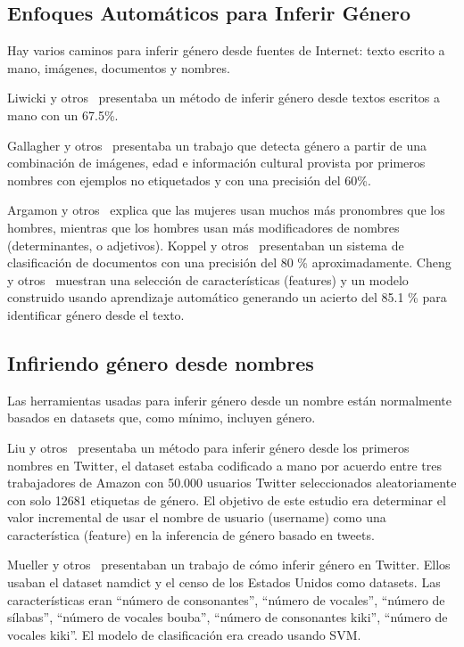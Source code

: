 \documentclass[a4paper]{article}
\begin{document}
\subsection{Enfoques Automáticos para Inferir Género}

Hay varios caminos para inferir género desde fuentes de Internet:
texto escrito a mano, imágenes, documentos y nombres.

Liwicki y otros~\cite{liwicki2011automatic} presentaba un
método de inferir género desde textos escritos a mano con
un 67.5\%.

Gallagher y otros~\cite{gallagher2008estimating} presentaba
un trabajo que detecta género a partir de una combinación de
imágenes, edad e información cultural provista por primeros
nombres con ejemplos no etiquetados y con una precisión del
60\%.

Argamon y otros~\cite{argamon2003gender} explica que las
mujeres usan muchos más pronombres que los hombres, mientras
que los hombres usan más modificadores de nombres (determinantes,
o adjetivos). Koppel y otros~\cite{koppel2002automatically}
presentaban un sistema de clasificación de documentos con una
precisión del 80 \% aproximadamente. Cheng y otros~\cite{cheng2011author}
muestran una selección de características (features) y un
modelo construido usando aprendizaje automático generando
un acierto del 85.1 \% para identificar género desde el texto.

\subsection{Infiriendo género desde nombres}

Las herramientas usadas para inferir género desde un nombre
están normalmente basados en datasets que, como mínimo, incluyen
género.

Liu y otros~\cite{liu2013s} presentaba un método para inferir
género desde los primeros nombres en Twitter, el dataset estaba
codificado a mano por acuerdo entre tres trabajadores de Amazon
con 50.000 usuarios Twitter seleccionados aleatoriamente con
solo 12681 etiquetas de género. El objetivo de este estudio
era determinar el valor incremental de usar el nombre de
usuario (username) como una característica (feature) en la
inferencia de género basado en tweets.

Mueller y otros~\cite{mueller2016gender} presentaban un trabajo
de cómo inferir género en Twitter. Ellos usaban el dataset
namdict y el censo de los Estados Unidos como datasets.
Las características eran ``número de consonantes'', ``número de
vocales'', ``número de sílabas'', ``número de vocales bouba'',
``número de consonantes kiki'', ``número de vocales kiki''. El
modelo de clasificación era creado usando SVM.
\end{document}
